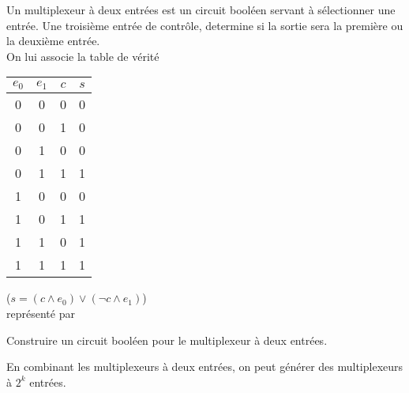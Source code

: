\begin{definition}
	Un multiplexeur à deux entrées est un circuit booléen servant à sélectionner une entrée. Une troisième entrée de contrôle, determine si la sortie sera la première ou la deuxième entrée.\\
	
	On lui associe la table de vérité \begin{tabular}{|c|c|c||c|}
		\hline
		$e_0$ & $e_1$ & $c$ & $s$  \\ \hline
		0 & 0 & 0 & 0 \\ \hline
		0 & 0 & 1 & 0 \\ \hline
		0 & 1 & 0 & 0 \\ \hline
		0 & 1 & 1 & 1 \\ \hline
		1 & 0 & 0 & 0 \\ \hline
		1 & 0 & 1 & 1 \\ \hline
		1 & 1 & 0 & 1 \\ \hline
		1 & 1 & 1 & 1 \\ \hline
	\end{tabular} \quad ($s = (c \wedge e_0) \vee (\neg c \wedge e_1)$)\\
	représenté par 
\end{definition}

\begin{exercise}
	Construire un circuit booléen pour le multiplexeur à deux entrées.
\end{exercise}

\begin{rem}
	En combinant les multiplexeurs à deux entrées, on peut générer des multiplexeurs à $2^k$ entrées.
\end{rem}

